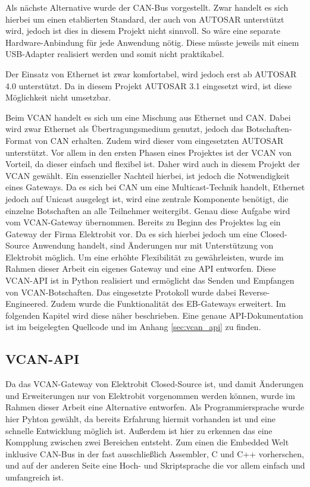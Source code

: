 \documentclass[
  a4paper,					    %
  twoside,
  DIV=calc,     				%
  bibliography=totoc,
  cleardoublepage=empty,
  ngerman,     					%
  final       					%
]{scrbook}
\begin{document}
Als nächste Alternative wurde der CAN-Bus vorgestellt. Zwar handelt es sich hierbei um einen etablierten Standard, der auch von AUTOSAR unterstützt wird, jedoch ist dies in diesem Projekt nicht sinnvoll. So wäre eine separate Hardware-Anbindung für jede Anwendung nötig. Diese müsste jeweils mit einem USB-Adapter realisiert werden und somit nicht praktikabel.

Der Einsatz von Ethernet ist zwar komfortabel, wird jedoch erst ab AUTOSAR 4.0 unterstützt. Da in diesem Projekt AUTOSAR 3.1 eingesetzt wird, ist diese Möglichkeit nicht umsetzbar.

Beim VCAN handelt es sich um eine Mischung aus Ethernet und CAN. Dabei wird zwar Ethernet als Übertragungsmedium genutzt, jedoch das Botschaften-Format von CAN erhalten. Zudem wird dieser vom eingesetzten AUTOSAR unterstützt. Vor allem in den ersten Phasen eines Projektes ist der VCAN von Vorteil, da dieser einfach und flexibel ist. Daher wird auch in diesem Projekt der VCAN gewählt. Ein essenzieller Nachteil hierbei, ist jedoch die Notwendigkeit eines Gateways. Da es sich bei CAN um eine Multicast-Technik handelt, Ethernet jedoch auf Unicast ausgelegt ist, wird eine zentrale Komponente benötigt, die einzelne Botschaften an alle Teilnehmer weitergibt. Genau diese Aufgabe wird vom VCAN-Gateway übernommen. Bereits zu Beginn des Projektes lag ein Gateway der Firma Elektrobit vor. Da es sich hierbei jedoch um eine Closed-Source Anwendung handelt, sind Änderungen nur mit Unterstützung von Elektrobit möglich. Um eine erhöhte Flexibilität zu gewährleisten, wurde im Rahmen dieser Arbeit ein eigenes Gateway und eine API entworfen. Diese VCAN-API ist in Python realisiert und ermöglicht das Senden und Empfangen von VCAN-Botschaften. Das eingesetzte Protokoll wurde dabei Reverse-Engineered. Zudem wurde die Funktionalität des EB-Gateways erweitert. Im folgenden Kapitel wird diese näher beschrieben. Eine genaue API-Dokumentation ist im beigelegten Quellcode und im Anhang \ref{sec:vcan_api} zu finden.


\subsection{VCAN-API}
\label{sec:VCAN_API}
Da das VCAN-Gateway von Elektrobit Closed-Source ist, und damit Änderungen und Erweiterungen nur von Elektrobit vorgenommen werden können, wurde im Rahmen dieser Arbeit eine Alternative entworfen. Als Programmiersprache wurde hier Pyhton gewählt, da bereits Erfahrung hiermit vorhanden ist und eine schnelle Entwicklung möglich ist. Außerdem ist hier zu erkennen das eine Kompplung zwischen zwei Bereichen entsteht. Zum einen die Embedded Welt inklusive CAN-Bus in der fast ausschließlich Assembler, C und C++ vorherschen, und auf der anderen Seite eine Hoch- und Skriptsprache die vor allem einfach und umfangreich ist.
\end{document}
